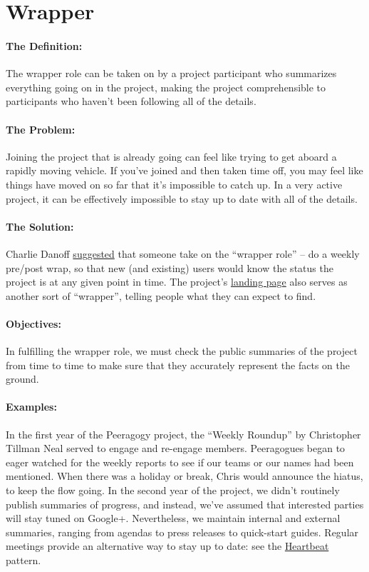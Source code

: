 \section{Wrapper}
\paragraph{The Definition:} The wrapper role can be taken on by a project
participant who summarizes everything going on in the project, making
the project comprehensible to participants who haven't been following
all of the details.

\paragraph{The Problem:} Joining the project that is already going can feel
like trying to get aboard a rapidly moving vehicle. If you've joined and
then taken time off, you may feel like things have moved on so far that
it's impossible to catch up. In a very active project, it can be
effectively impossible to stay up to date with all of the details.

\paragraph{The Solution:} Charlie
Danoff \href{http://socialmediaclassroom.com/host/peeragogy/wiki/rolesdivision-labor}{suggested}
that someone take on the ``wrapper role'' -- do a weekly pre/post wrap,
so that new (and existing) users would know the status the project is at
any given point in time. The
project's \href{http://socialmediaclassroom.com/host/peeragogy/}{landing
page} also serves as another sort of ``wrapper'', telling people what
they can expect to find.

\paragraph{Objectives:} In fulfilling the wrapper role, we must check the
public summaries of the project from time to time to make sure that they
accurately represent the facts on the ground.

\paragraph{Examples:} In the first year of the Peeragogy project, the
``Weekly Roundup'' by Christopher Tillman Neal served to engage and
re-engage members. Peeragogues began to eager watched for the weekly
reports to see if our teams or our names had been mentioned. When there
was a holiday or break, Chris would announce the hiatus, to keep the
flow going. In the second year of the project, we didn't routinely
publish summaries of progress, and instead, we've assumed that
interested parties will stay tuned on Google+. Nevertheless, we maintain
internal and external summaries, ranging from agendas to press releases
to quick-start guides. Regular meetings provide an alternative way to
stay up to date: see
the \href{http://peeragogy.org/patterns/heartbeat/}{Heartbeat} pattern.

